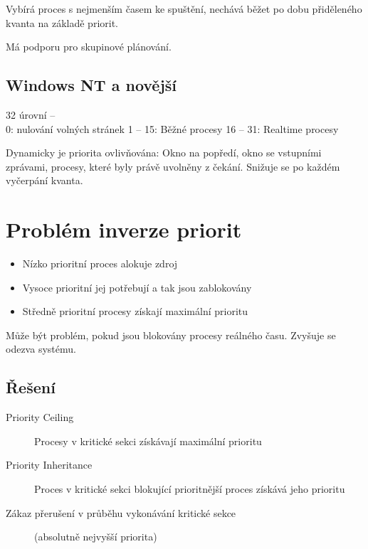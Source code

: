 \documentclass[a4paper, 11pt]{report}
\begin{document}
Vybírá proces s nejmenším časem ke spuštění, nechává běžet po dobu přiděleného kvanta na základě priorit.

Má podporu pro skupinové plánování.

\subsection{Windows NT a novější}

32 úrovní --\\
0: nulování volných stránek
1 -- 15: Běžné procesy
16 -- 31: Realtime procesy

Dynamicky je priorita ovlivňována: Okno na popředí, okno se vstupními zprávami, procesy, které byly právě uvolněny z čekání. Snižuje se po každém vyčerpání kvanta.

\section{Problém inverze priorit}

\begin{itemize}
	\item Nízko prioritní proces alokuje zdroj
	\item Vysoce prioritní jej potřebují a tak jsou zablokovány
	\item Středně prioritní procesy získají maximální prioritu
\end{itemize}

Může být problém, pokud jsou blokovány procesy reálného času. Zvyšuje se odezva systému.

\subsection{Řešení}
\begin{description}
	\item[Priority Ceiling] Procesy v kritické sekci získávají maximální prioritu
	\item[Priority Inheritance] Proces v kritické sekci blokující prioritnější proces získává jeho prioritu
	\item[Zákaz přerušení v průběhu vykonávání kritické sekce] (absolutně nejvyšší priorita)
\end{description}
\end{document}
